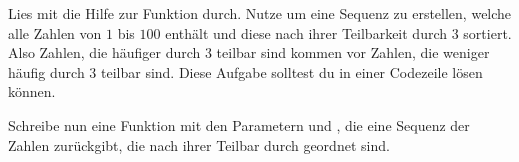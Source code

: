 \begin{aufg}
  Lies mit  die Hilfe zur Funktion  durch.
  Nutze  um eine Sequenz zu erstellen, welche alle Zahlen von $1$ bis
  $100$ enthält und diese nach ihrer Teilbarkeit durch $3$ sortiert.
  Also Zahlen, die häufiger durch $3$ teilbar sind kommen vor Zahlen, die
  weniger häufig durch $3$ teilbar sind.
  Diese Aufgabe solltest du in einer Codezeile lösen können.
  
  Schreibe nun eine Funktion mit den Parametern  und ,
  die eine Sequenz der Zahlen  zurückgibt, die nach ihrer Teilbar
  durch  geordnet sind.
\end{aufg}
